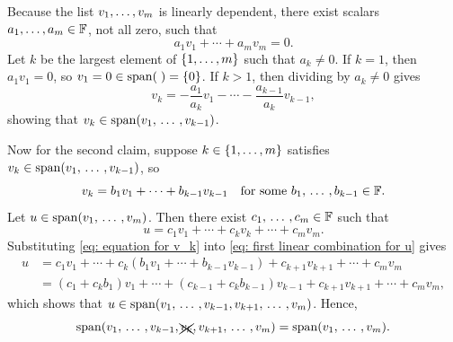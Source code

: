\begin{prf}
  Because the list $v_1, \dots, v_m$ is linearly dependent, there exist scalars $a_1, \ldots, a_m \in \mathbb{F}$, not all zero, such that
  \begin{equation}
    a_1 v_1 + \cdots + a_m v_m = 0.
  \end{equation}
  Let $k$ be the largest element of $\{ 1, \ldots, m \}$ such that $a_k \neq 0$.
  If $k = 1$, then $a_1 v_1 = 0$, so $v_1 = 0 \in \operatorname{span} (\;) = \{0\}$.
  If $k > 1$, then dividing by $a_k \neq 0$ gives
  \begin{equation}
    v_k = - \frac{a_1}{a_k}v_1 - \cdots - \frac{a_{k-1}}{a_k}v_{k-1},
  \end{equation}
  showing that $v_k \in \operatorname{span} (v_1, {\, \ldots \,\,}, v_{k-1})$.

  Now for the second claim, suppose $k \in \{ 1, \ldots, m \}$ satisfies $v_k \in \operatorname{span} (v_1, {\, \ldots \,\,}, v_{k-1})$, so
  \begin{equation}
    \label{eq: equation for v_k}
    v_k = b_1v_1 + \cdots + b_{k-1}v_{k-1} \quad \text{for some } b_1, {\, \ldots \,\,}, b_{k-1} \in \mathbb{F}.
  \end{equation}
  Let $u \in \operatorname{span} (v_1, {\, \ldots \,\,}, v_m)$. Then there exist $c_1, {\, \ldots \,\,}, c_m \in \mathbb{F}$ such that
  \begin{equation}
    \label{eq: first linear combination for u}
    u = c_1v_1 + \cdots + c_kv_k + \cdots + c_{m}v_{m}.
  \end{equation}
  Substituting \eqref{eq: equation for v_k} into \eqref{eq: first linear combination for u} gives
  \begin{equation}
    \begin{aligned}
      \label{eq: second linear combination for u}
      u &= c_1v_1 + \cdots + c_k (b_1v_1 + \cdots + b_{k-1}v_{k-1}) + c_{k+1} v_{k+1} + \cdots + c_m v_m \\
        &= (c_1 + c_k b_1) v_1 + \cdots + (c_{k-1}+c_k b_{k-1}) v_{k-1} + c_{k+1} v_{k+1} + \cdots + c_m v_m,
    \end{aligned}
  \end{equation}
  which shows that $u \in \operatorname{span} (v_1, {\, \ldots \,\,}, v_{k-1}, v_{k+1}, {\, \ldots \,\,}, v_m)$. Hence,
  \begin{equation}
    \operatorname{span} (v_1, {\, \ldots \,\,}, v_{k-1}, \xcancel{v_k}, v_{k+1}, {\, \ldots \,\,}, v_m) = \operatorname{span} (v_1, {\, \ldots \,\,}, v_m).
  \end{equation}
\end{prf}

